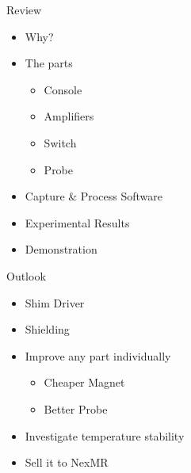 \documentclass{ethpresentation}
\begin{document}
\begin{frame}{Review}
  \begin{itemize}
    \item Why?
    \item The parts%
          \begin{itemize}
            \item Console
            \item Amplifiers
            \item Switch
            \item Probe
          \end{itemize}
    \item Capture \& Process Software
    \item Experimental Results
    \item Demonstration
  \end{itemize}
\end{frame}

\begin{frame}{Outlook}
  \begin{itemize}
    \item Shim Driver
    \item Shielding
    \item Improve any part individually%
          \begin{itemize}
            \item Cheaper Magnet
            \item Better Probe
          \end{itemize}
    \item Investigate temperature stability
    \item Sell it to NexMR
  \end{itemize}
\end{frame}

\end{document}
